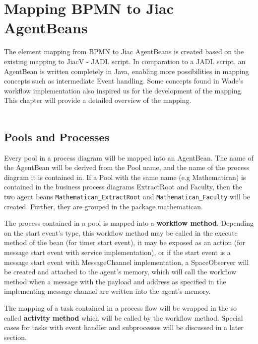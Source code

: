 \chapter{Mapping BPMN to Jiac AgentBeans}
\label{chap:mapping}
The element mapping from BPMN to Jiac AgentBeans is created based on the existing mapping to JiacV - JADL script. In comparation to a JADL script, an AgentBean is written completely in Java, enabling more possibilities in mapping concepts such as intermediate Event handling. Some concepts found in Wade's workflow implementation also inspired us for the development of the mapping. This chapter will provide a detailed overview of the mapping.\\\\

\section{Pools and Processes}
Every pool in a process diagram will be mapped into an AgentBean. The name of the AgentBean will be derived from the Pool name, and the name of the process diagram it is contained in. If a Pool with the same name (e.g Mathematican) is contained in the business process diagrams ExtractRoot and Faculty, then the two agent beans \texttt{Mathematican\_ExtractRoot} and \texttt{Mathematican\_Faculty} will be created. Further, they are grouped in the package mathematican. 

The process contained in a pool is mapped into a \textbf{workflow method}. Depending on the start event's type, this workflow method may be called in the execute method of the bean (for timer start event), it may be exposed as an action (for message start event with service implementation), or if the start event is a message start event with MessageChannel implementation, a SpaceObserver will be created and attached to the agent's memory, which will call the workflow method when a message with the payload and address as specified in the implementing message channel are written into the agent's memory.

The mapping of a task contained in a process flow will be wrapped in the so called \textbf{activity method} which will be called by the workflow method. Special cases for tasks with event handler and subprocesses will be discussed in a later section.

